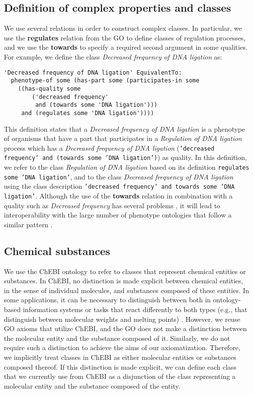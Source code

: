 \documentclass{article}
\begin{document}
\subsection{Definition of complex properties and classes}
We use several relations in order to construct complex classes. In
particular, we use the {\bf regulates} relation from the GO to define
classes of regulation processes, and we use the {\bf towards} to
specify a required second argument in some qualities. 
For example, we define the class {\em Decreased frequency of DNA
  ligation} as:
\begin{verbatim}
'Decreased frequency of DNA ligation' EquivalentTo:
  phenotype-of some (has-part some (participates-in some 
    ((has-quality some 
        ('decreased frequency'
         and (towards some 'DNA ligation')))
     and (regulates some 'DNA ligation'))))
\end{verbatim}
This definition states that a {\em Decreased frequency of DNA
  ligation} is a phenotype of organisms that have a part that
participates in a {\em Regulation of DNA ligation} process which has a
{\em Decreased frequency of DNA ligation} ({\tt 'decreased frequency'
  and (towards some 'DNA ligation')}) as quality. In this definition,
we refer to the class {\em Regulation of DNA ligation} based on its
definition {\tt regulates some 'DNA ligation'}, and to the class {\em
  Decreased frequency of DNA ligation} using the class description
{\tt 'decreased frequency' and towards some 'DNA ligation'}. Although
the use of the {\bf towards} relation in combination with a quality
such as {\em Decreased frequency} has several problems
\cite{obml2011h3}, it will lead to interoperability with the large
number of phenotype ontologies that follow a similar pattern
\cite{Mungall2010}.

\subsection{Chemical substances}
We use the ChEBI ontology \cite{Degtyarenko2007} to refer to classes
that represent chemical entities or substances. In ChEBI, no
distinction is made explicit between chemical entities, in the sense
of individual molecules, and substances composed of these entities.
In some applications, it can be necessary to distinguish between both
in ontology-based information systems or tasks that react differently
to both types (e.g., that distinguish between molecular weights and
melting points) \cite{}. However, we reuse GO axioms that utilize
ChEBI, and the GO does not make a distinction between the molecular
entity and the substance composed of it. Similarly, we do not require
such a distinction to achieve the aims of our
axiomatization. Therefore, we implicitly treat classes in ChEBI as either
molecular entities or substances composed thereof. If this distinction
is made explicit, we can define each class that we currently use from
ChEBI as a disjunction of the class representing a molecular entity
and the substance composed of the entity.
\end{document}

